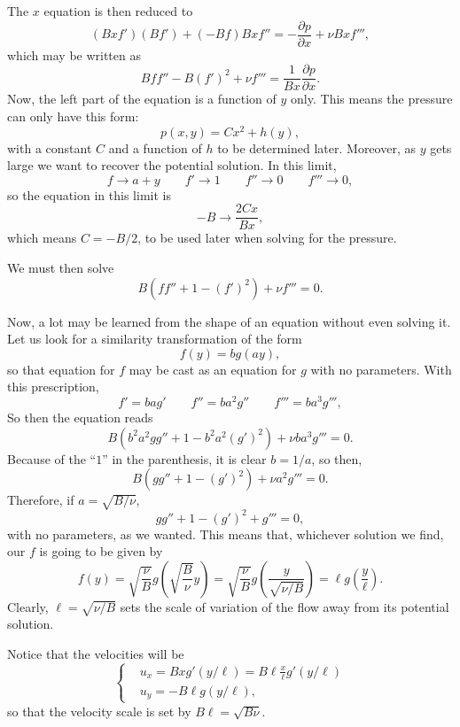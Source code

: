 The $x$ equation is then reduced to
\[
 (B x f') (B f') + (-B f) B x f'' =  - \frac{\partial p}{\partial x} +
\nu B x f''' ,
\]
which may be written as
\[
B f f'' - B (f')^2 + \nu f''' = \frac{1}{B x} \frac{\partial
  p}{\partial x}  .
\]
Now, the left part of the equation is a function of $y$ only. This
means the pressure can only have this form:
\[
p(x,y) = C x^2 + h(y) ,
\]
with a constant $C$ and a function of $h$ to be determined later. Moreover,
as $y$ gets large we want to recover the potential solution. In this limit,
\[
f \to a + y \qquad f' \to 1 \qquad f'' \to 0 \qquad f'''\to 0 ,
\]
so the equation in this limit is
\[
- B \to  \frac{2 C x }{B x} ,
\]
which means $C =-B/2$, to be used later when solving for the pressure.

We must then solve
\[
 B \left(  f f'' + 1-  (f')^2 \right) + \nu f''' = 0 .
\]

Now, a lot may be learned from the shape of an equation without even
solving it. Let us look for a similarity transformation of the
form
\[
f(y) = b g(a y) ,
\]
so that equation for $f$ may be cast as an equation for $g$ with no
parameters. With this prescription,
\[
f' = ba g' \qquad f''=b a^2 g'' \qquad f'''= b a^3 g''' ,
\]
So then the equation reads
\[
 B \left(  b^2 a^2 g g'' + 1-  b^2 a^2 (g')^2 \right) + \nu b a^3  g''' = 0 .
\]
Because of the ``$1$'' in the parenthesis, it is clear $b=1/a$, so then,
\[
 B \left(  g g'' + 1-  (g')^2 \right) + \nu  a^2  g''' = 0 .
\]
Therefore, if $a=\sqrt{B/\nu}$,
\begin{equation}
  \label{eq:Z_ode}
  g g'' + 1-  (g')^2  +  g''' = 0 ,
\end{equation}
with no parameters, as we wanted. This means that, whichever solution
we find, our $f$ is going to be given by
\[
f(y) = \sqrt{\frac{\nu}{B}} g\left(\sqrt{\frac{B}{\nu}}  y  \right) =
\sqrt{\frac{\nu}{B}} g\left(\frac{y}{ \sqrt{\nu/B} } \right) =
 \ell g\left(\frac{y}{ \ell } \right) .
\]
Clearly, $\ell = \sqrt{\nu/B} $ sets the scale of variation of the
flow away from its potential solution.

Notice that the velocities will be
\[
\begin{cases}
  & u_x =   B x g'(y/\ell) = B\ell \frac{x}{\ell} g'(y/\ell)  \\
  & u_y = - B \ell g(y/\ell)  ,
\end{cases}
\]
so that the velocity scale is set by $B\ell=\sqrt{B\nu}$.






